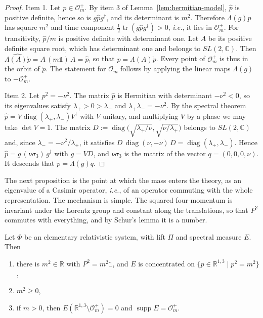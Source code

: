 	\begin{proof}
		Item 1. Let $p\in\mathcal{O}_m^+$. By item 3 of Lemma~\ref{lem:hermitian-model}, $\hat{p}$ is positive definite, hence so is $g\hat{p}g^\dagger$, and its determinant is $m^2$. Therefore $\Lambda(g)p$ has square $m^2$ and time component $\tfrac12\operatorname{tr}(g\hat{p}g^\dagger)>0$, \textit{i.e.}, it lies in $\mathcal{O}_m^+$. For transitivity, $\hat{p}/m$ is positive definite with determinant one. Let $A$ be its positive definite square root, which has determinant one and belongs to $SL(2,\mathbb{C})$. Then $\widehat{\Lambda(A)\mathring{p}}=A\,(m\mathbb{1})\,A=\hat{p}$, so that $p=\Lambda(A)\mathring{p}$. Every point of $\mathcal{O}_m^+$ is thus in the orbit of $\mathring{p}$. The statement for $\mathcal{O}_m^-$ follows by applying the linear maps $\Lambda(g)$ to $-\mathcal{O}_m^+$.
		
		Item 2. Let $p^2=-\nu^2$. The matrix $\hat{p}$ is Hermitian with determinant $-\nu^2<0$, so its eigenvalues satisfy $\lambda_+>0>\lambda_-$ and $\lambda_+\lambda_-=-\nu^2$. By the spectral theorem $\hat{p}=V\operatorname{diag}(\lambda_+,\lambda_-)V^\dagger$ with $V$ unitary, and multiplying $V$ by a phase we may take $\det V=1$. The matrix $D:=\operatorname{diag}\big(\sqrt{\lambda_+/\nu},\sqrt{\nu/\lambda_+}\big)$ belongs to $SL(2,\mathbb{C})$ and, since $\lambda_-=-\nu^2/\lambda_+$, it satisfies $D\,\operatorname{diag}(\nu,-\nu)\,D=\operatorname{diag}(\lambda_+,\lambda_-)$. Hence $\hat{p}=g\,(\nu\sigma_3)\,g^\dagger$ with $g=VD$, and $\nu\sigma_3$ is the matrix of the vector $q=(0,0,0,\nu)$. It descends that $p=\Lambda(g)q$.
	\end{proof}
	
	The next proposition is the point at which the mass enters the theory, as an eigenvalue of a Casimir operator, \textit{i.e.}, of an operator commuting with the whole representation. The mechanism is simple. The squared four-momentum is invariant under the Lorentz group and constant along the translations, so that $P^2$ commutes with everything, and by Schur's lemma it is a number.
	
	\begin{proposition}\label{prop:mass-shell}
		Let $\Phi$ be an elementary relativistic system, with lift $\Pi$ and spectral measure $E$. Then
		\begin{enumerate}
			\item there is $m^2\in\mathbb{R}$ with $P^2=m^2\mathbb{1}$, and $E$ is concentrated on $\{p\in\mathbb{R}^{1,3}\mid p^2=m^2\}$,
			\item $m^2\geq0$,
			\item if $m>0$, then $E(\mathbb{R}^{1,3}\setminus\mathcal{O}_m^+)=0$ and $\operatorname{supp}E=\mathcal{O}_m^+$.
		\end{enumerate}
	\end{proposition}
	
